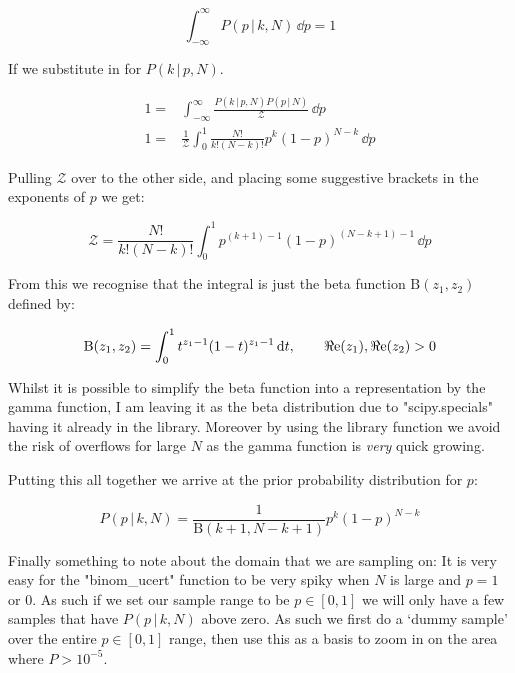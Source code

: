\documentclass[10pt, a4paper]{article}
\begin{document}
\begin{equation}
 \int_{-\infty}^\infty P(p\,|\,k,N) \,\dd p = 1
\end{equation}

If we substitute in for $P(k \,|\,p,N)$.

\begin{align}
 1 =& \int_{-\infty}^\infty  \frac{ P(k \,|\,p,N)  P(p\,|\,N) }{\mathcal{Z}} \,\dd p\\
 1 =& \frac{1}{\mathcal{Z}}\int_{0}^1 \frac{N!}{k!(N-k)!}p^k(1-p)^{N-k} \,\dd p
\end{align}

Pulling $\mathcal{Z}$ over to the other side, and placing some suggestive brackets in the exponents of $p$ we get:

\begin{equation}
 \mathcal{Z} =  \frac{N!}{k!(N-k)!} \int_0^1 p^{(k+1)-1}(1-p)^{(N-k+1)-1} \,\dd p
\end{equation}

From this we recognise that the integral is just the beta function $\mathrm B(z_1, z_2)$ defined by:

\begin{equation}
 \mathrm B(z_1, z_2) = \int_0^1 t^{z_1-1}(1-t)^{z_1-1}\,\dd t, \qquad \real \mathrm e(z_1), \real \mathrm e  (z_2) > 0
\end{equation}

Whilst it is possible to simplify the beta function into a representation by the gamma function, I am leaving it as the beta distribution due to "scipy.specials" having it already in the library. Moreover by using the library function we avoid the risk of overflows for large $N$ as the gamma function is \emph{very} quick growing.

Putting this all together we arrive at the prior probability distribution for $p$:

\begin{equation}
P(p \,|\, k, N ) = \frac{1}{\mathrm B(k+1, N-k+1)} p^k (1-p)^{N-k}
 \label{eqn:binom2}
\end{equation}

Finally something to note about the domain that we are sampling on: It is very easy for the "binom_ucert" function to be very spiky when $N$ is large and $p=1$ or $0$. As such if we set our sample range to be $p\in[0,1]$ we will only have a few samples that have $P(p \,|\, k, N )$ above zero. As such we first do a `dummy sample' over the entire $p\in[0,1]$ range, then use this as a basis to zoom in on the area where $P > 10^{-5}$.  
\end{document}
